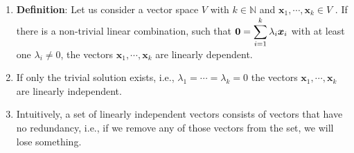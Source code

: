 \begin{enumerate}
    \item \textbf{Definition}: Let us consider a vector space $V$ with $k \in \mathbb{N}$ and $\bm{x}_1, \cdots , \bm{x}_k \in V$ . 
    If there is a non-trivial linear combination, such that $\bm{0} = \displaystyle\sum ^k _{i=1} \lambda_i \bm{x}_i$ with at least one $\lambda _i \neq 0$, the vectors  $\bm{x}_1, \cdots , \bm{x}_k$ are linearly dependent. 
    \hfill \cite{mfml/book/mml/Deisenroth-Faisal-Ong}
    
    \item If only the trivial solution exists, i.e., $\lambda _1 = \cdots = \lambda _k = 0$ the vectors $\bm{x}_1, \cdots , \bm{x}_k$ are linearly independent.
    \hfill \cite{mfml/book/mml/Deisenroth-Faisal-Ong}

    \item Intuitively, a set of linearly independent vectors consists of vectors that have no redundancy, i.e., if we remove any of those vectors from the set, we will lose something.
    \hfill \cite{mfml/book/mml/Deisenroth-Faisal-Ong}
\end{enumerate}


